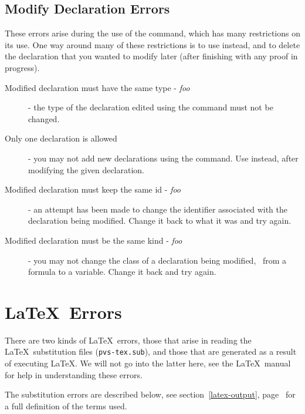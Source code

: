 \subsection{Modify Declaration Errors}

These errors arise during the use of the 
command, which has many restrictions on its use.  One way around many of
these restrictions is to use  instead, and to
delete the declaration that you wanted to modify later (after finishing
with any proof in progress).

\begin{description}

\item[Modified declaration must have the same type - \emph{foo}] - the
type of the declaration edited using the 
command must not be changed.

\item[Only one declaration is allowed] - you may not add new declarations
using the  command.  Use 
instead, after modifying the given declaration.

\item[Modified declaration must keep the same id - \emph{foo}] - an
attempt has been made to change the identifier associated with the
declaration being modified.  Change it back to what it was and try again.

\item[Modified declaration must be the same kind - \emph{foo}] - you may
not change the class of a declaration being modified, \eg\ from a formula
to a variable.  Change it back and try again.

\end{description}

\section{\LaTeX\ Errors}

There are two kinds of \LaTeX\ errors, those that arise in reading the
\LaTeX\ substitution files (\texttt{pvs-tex.sub}), and those that are
generated as a result of executing \LaTeX.  We will not go into the latter
here, see the \LaTeX\ manual~\cite{latex2e} for help in understanding these
errors.  

The substitution errors are described below, see
section~\ref{latex-output}, page~\pageref{latex-output} for a full
definition of the terms used.


